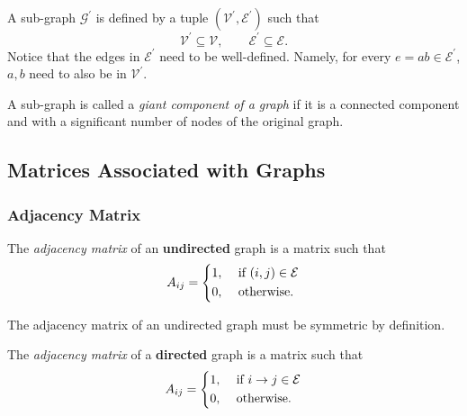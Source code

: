 \begin{definition}
	A sub-graph \(\mathcal{G}^\prime\) is defined by a tuple \((\mathcal{V}^\prime, \mathcal{E}^\prime)\) such that
	\[
		\mathcal{V}^\prime \subseteq \mathcal{V}, \qquad \mathcal{E}^\prime\subseteq\mathcal{E}.
	\]
	Notice that the edges in \(\mathcal{E}^\prime\) need to be well-defined. Namely, for every \(e = ab\in\mathcal{E}^\prime\), \(a, b\) need to also be in \(\mathcal{V}^\prime\).
\end{definition}

\begin{definition}
	A sub-graph is called a \emph{giant component of a graph} if it is a connected component and with a significant number of nodes of the original graph.
\end{definition}

\subsection{Matrices Associated with Graphs}
\subsubsection{Adjacency Matrix}
\begin{definition}
	The \emph{adjacency matrix} of an \textbf{undirected} graph is a matrix such that
	\[
		A_{ij} =\begin{dcases}
			1, & \text{ if }(i, j)\in\mathcal{E} \\
			0, & \text{ otherwise.}
		\end{dcases}
	\]
\end{definition}
\begin{remark}
	The adjacency matrix of an undirected graph must be symmetric by definition.
\end{remark}

\begin{definition}
	The \emph{adjacency matrix} of a \textbf{directed} graph is a matrix such that
	\[
		A_{ij} = \begin{dcases}
			1, & \text{ if }i\to j\in\mathcal{E} \\
			0, & \text{ otherwise.}
		\end{dcases}
	\]
\end{definition}
